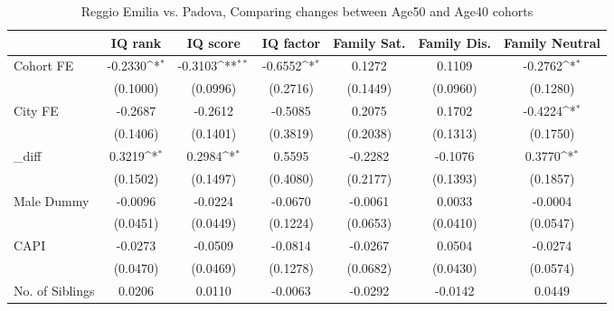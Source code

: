 \begin{table}[htbp]\centering
\def\sym#1{\ifmmode^{#1}\else\(^{#1}\)\fi}
\caption{Reggio Emilia vs. Padova, Comparing changes between Age50 and Age40 cohorts}
\begin{tabular}{l*{6}{c}}
\toprule
            &\multicolumn{1}{c}{IQ rank}&\multicolumn{1}{c}{IQ score}&\multicolumn{1}{c}{IQ factor}&\multicolumn{1}{c}{Family Sat.}&\multicolumn{1}{c}{Family Dis.}&\multicolumn{1}{c}{Family Neutral}\\
\midrule
Cohort FE   &     -0.2330\sym{*}  &     -0.3103\sym{**} &     -0.6552\sym{*}  &      0.1272         &      0.1109         &     -0.2762\sym{*}  \\
            &    (0.1000)         &    (0.0996)         &    (0.2716)         &    (0.1449)         &    (0.0960)         &    (0.1280)         \\
\addlinespace
City FE     &     -0.2687         &     -0.2612         &     -0.5085         &      0.2075         &      0.1702         &     -0.4224\sym{*}  \\
            &    (0.1406)         &    (0.1401)         &    (0.3819)         &    (0.2038)         &    (0.1313)         &    (0.1750)         \\
\addlinespace
\_diff       &      0.3219\sym{*}  &      0.2984\sym{*}  &      0.5595         &     -0.2282         &     -0.1076         &      0.3770\sym{*}  \\
            &    (0.1502)         &    (0.1497)         &    (0.4080)         &    (0.2177)         &    (0.1393)         &    (0.1857)         \\
\addlinespace
Male Dummy  &     -0.0096         &     -0.0224         &     -0.0670         &     -0.0061         &      0.0033         &     -0.0004         \\
            &    (0.0451)         &    (0.0449)         &    (0.1224)         &    (0.0653)         &    (0.0410)         &    (0.0547)         \\
\addlinespace
CAPI        &     -0.0273         &     -0.0509         &     -0.0814         &     -0.0267         &      0.0504         &     -0.0274         \\
            &    (0.0470)         &    (0.0469)         &    (0.1278)         &    (0.0682)         &    (0.0430)         &    (0.0574)         \\
\addlinespace
No. of Siblings&      0.0206         &      0.0110         &     -0.0063         &     -0.0292         &     -0.0142         &      0.0449         \\

\end{tabular}
\end{table}
